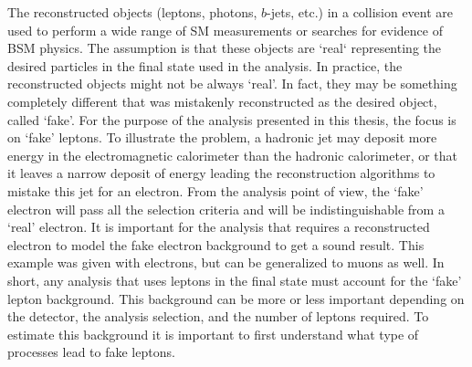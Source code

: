 The reconstructed objects (leptons, photons, $b$-jets, etc.) in a collision event are used to perform a wide range of SM measurements 
or searches for evidence of BSM physics. The assumption is that these objects are `real` representing the desired particles 
in the final state used in the analysis. 
In practice, the reconstructed objects might not be always `real'. In fact, they may be something completely different that
was mistakenly reconstructed as the desired object, called `fake'. 
For the purpose of the analysis presented in this thesis, the focus is on `fake' leptons. 
To illustrate the problem, a hadronic jet may deposit more energy in the electromagnetic calorimeter than the hadronic calorimeter, 
or that it leaves a narrow deposit of energy leading the reconstruction algorithms to mistake this jet for an electron.
From the analysis point of view, the `fake' electron will pass all the selection criteria and will be indistinguishable from 
a `real' electron. 
It is important for the analysis that requires a reconstructed electron to model the fake electron background to get a sound 
result. This example was given with electrons, but can be generalized to muons as well. 
In short, any analysis that uses leptons in the final state must account for the `fake' lepton background. 
This background can be more or less important depending on the detector, the analysis selection, and the number of leptons required. 
To estimate this background it is important to first understand what type of processes lead to fake leptons.
